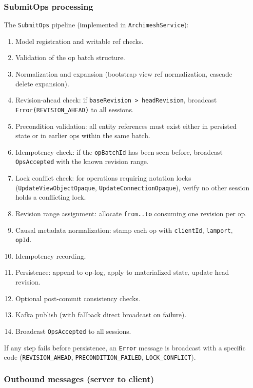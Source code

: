 \subsubsection{SubmitOps processing}

The \texttt{SubmitOps} pipeline (implemented in \texttt{ArchimeshService}):

\begin{enumerate}
\item Model registration and writable ref checks.
\item Validation of the op batch structure.
\item Normalization and expansion (bootstrap view ref normalization,
  cascade delete expansion).
\item Revision-ahead check: if \texttt{baseRevision > headRevision},
  broadcast \texttt{Error(REVISION\_AHEAD)} to all sessions.
\item Precondition validation: all entity references must exist either in
  persisted state or in earlier ops within the same batch.
\item Idempotency check: if the \texttt{opBatchId} has been seen before,
  broadcast \texttt{OpsAccepted} with the known revision range.
\item Lock conflict check: for operations requiring notation locks
  (\texttt{UpdateViewObjectOpaque}, \texttt{UpdateConnectionOpaque}),
  verify no other session holds a conflicting lock.
\item Revision range assignment: allocate \texttt{from..to} consuming one
  revision per op.
\item Causal metadata normalization: stamp each op with
  \texttt{clientId}, \texttt{lamport}, \texttt{opId}.
\item Idempotency recording.
\item Persistence: append to op-log, apply to materialized state, update
  head revision.
\item Optional post-commit consistency checks.
\item Kafka publish (with fallback direct broadcast on failure).
\item Broadcast \texttt{OpsAccepted} to all sessions.
\end{enumerate}

If any step fails before persistence, an \texttt{Error} message is broadcast
with a specific code (\texttt{REVISION\_AHEAD}, \texttt{PRECONDITION\_FAILED},
\texttt{LOCK\_CONFLICT}).

\subsubsection{Outbound messages (server to client)}

